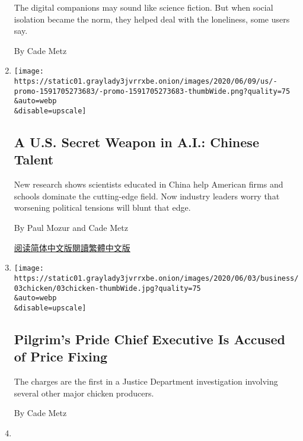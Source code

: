 \begin{enumerate}
  The digital companions may sound like science fiction. But when social
  isolation became the norm, they helped deal with the loneliness, some
  users say.

  By Cade Metz
\item
  \href{/2020/06/09/technology/china-ai-research-education.html}{}

  \texttt{[image: https://static01.graylady3jvrrxbe.onion/images/2020/06/09/us/-promo-1591705273683/-promo-1591705273683-thumbWide.png?quality=75\\\&auto=webp\\\&disable=upscale]}

  \hypertarget{a-us-secret-weapon-in-ai-chinese-talent}{%
  \subsection{A U.S. Secret Weapon in A.I.: Chinese
  Talent}\label{a-us-secret-weapon-in-ai-chinese-talent}}

  New research shows scientists educated in China help American firms
  and schools dominate the cutting-edge field. Now industry leaders
  worry that worsening political tensions will blunt that edge.

  By Paul Mozur and Cade Metz

  \href{https://cn.nytimes3xbfgragh.onion/technology/20200610/china-ai-research-education/}{阅读简体中文版}\href{https://cn.nytimes3xbfgragh.onion/technology/20200610/china-ai-research-education/zh-hant/}{閱讀繁體中文版}
\item
  \href{/2020/06/03/business/pilgrims-pride-chicken-price-fixing.html}{}

  \texttt{[image: https://static01.graylady3jvrrxbe.onion/images/2020/06/03/business/03chicken/03chicken-thumbWide.jpg?quality=75\\\&auto=webp\\\&disable=upscale]}

  \hypertarget{pilgrims-pride-chief-executive-is-accused-of-price-fixing}{%
  \subsection{Pilgrim's Pride Chief Executive Is Accused of Price
  Fixing}\label{pilgrims-pride-chief-executive-is-accused-of-price-fixing}}

  The charges are the first in a Justice Department investigation
  involving several other major chicken producers.

  By Cade Metz
\item
  \href{/es/2020/05/21/espanol/ciencia-y-tecnologia/pandemia-robots-delivery.html}{}


\end{enumerate}
